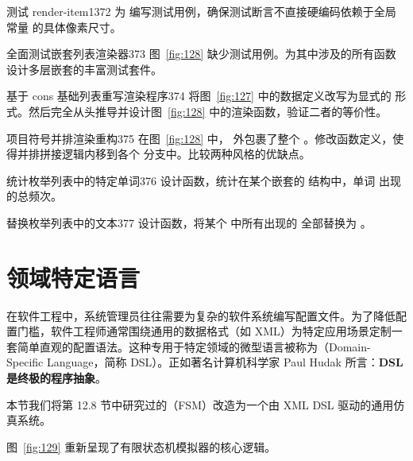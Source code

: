 \begin{exercise}{测试 render-item1}{372}
为  编写测试用例，确保测试断言不直接硬编码依赖于全局常量  的具体像素尺寸。
\end{exercise}

\begin{exercise}{全面测试嵌套列表渲染器}{373}
图~\ref{fig:128} 缺少测试用例。为其中涉及的所有函数设计多层嵌套的丰富测试套件。
\end{exercise}

\begin{exercise}{基于 cons 基础列表重写渲染程序}{374}
将图~\ref{fig:127} 中的数据定义改写为显式的  形式。然后完全从头推导并设计图~\ref{fig:128} 中的渲染函数，验证二者的等价性。
\end{exercise}

\begin{exercise}{项目符号并排渲染重构}{375}
在图~\ref{fig:128} 中， 外包裹了整个 。修改函数定义，使得并排拼接逻辑内移到各个  分支中。比较两种风格的优缺点。
\end{exercise}

\begin{exercise}{统计枚举列表中的特定单词}{376}
设计函数，统计在某个嵌套的  结构中，单词  出现的总频次。
\end{exercise}

\begin{exercise}{替换枚举列表中的文本}{377}
设计函数，将某个  中所有出现的  全部替换为 。
\end{exercise}

\section{领域特定语言 }
\label{sec:22.3_dsl}

在软件工程中，系统管理员往往需要为复杂的软件系统编写配置文件。为了降低配置门槛，软件工程师通常围绕通用的数据格式（如 XML）为特定应用场景定制一套简单直观的配置语法。这种专用于特定领域的微型语言被称为（Domain-Specific Language，简称 DSL）。正如著名计算机科学家 Paul Hudak 所言：\textbf{DSL 是终极的程序抽象}。

本节我们将第 12.8 节中研究过的（FSM）改造为一个由 XML DSL 驱动的通用仿真系统。

图~\ref{fig:129} 重新呈现了有限状态机模拟器的核心逻辑。

